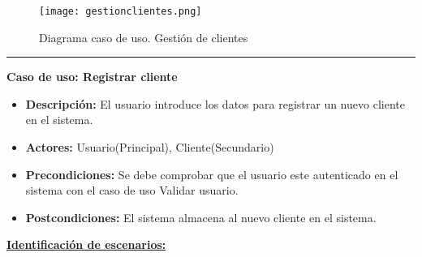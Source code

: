 \begin{figure}[H]
  \centering
    \texttt{[image: gestionclientes.png]}
  \caption{Diagrama caso de uso. Gestión de clientes}
  \label{cu1}
\end{figure}
\smallskip
\hrule height 1pt
\smallskip
\textbf{Caso de uso: Registrar cliente}
\begin{itemize}\renewcommand{\labelitemi}{$\cdot$}
 \item \textbf{Descripción:} El usuario introduce los datos para registrar un nuevo cliente en el sistema.
  \item \textbf{Actores:} Usuario(Principal), Cliente(Secundario)
  \item \textbf{Precondiciones:} Se debe comprobar que el usuario este autenticado en el sistema con el caso de uso Validar usuario.
  \item \textbf{Postcondiciones:} El sistema almacena al nuevo cliente en el sistema.
\end{itemize}
\underline{\textbf{Identificación de escenarios:}}
